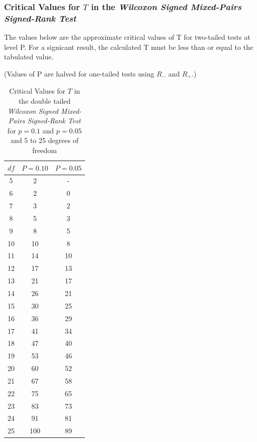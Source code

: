 \subsubsection{Critical Values for $T$ in the \emph{Wilcoxon Signed Mixed-Pairs Signed-Rank Test}}


The values below are the approximate critical values of T for two-tailed tests at level P. For a signicant result, the calculated T must be less  than or equal to the tabulated value.

(Values of P are halved for one-tailed tests using $R_-$ and $R_+$.)

\begin{table}[hbt]
  \begin{tabular}{c|cc}
    $df$ &  $P=0.10$ & $P=0.05$ \\
     \hline
    5 & 2 & - \\
    6 & 2 & 0 \\
    7 & 3 & 2 \\
    8 & 5 & 3 \\
    9 & 8 & 5 \\
    10 & 10 & 8 \\
    11 & 14 & 10 \\
    12 & 17 & 13 \\
    13 & 21 & 17 \\
    14 & 26 & 21 \\
    15 & 30 & 25 \\
    16 & 36 & 29 \\
    17 & 41 & 34 \\
    18 & 47 & 40 \\
    19 & 53 & 46 \\
    20 & 60 & 52 \\
    21 & 67 & 58 \\
    22 & 75 & 65 \\
    23 & 83 & 73 \\
    24 & 91 & 81 \\
    25 & 100 & 89
  \end{tabular}
  \caption{Critical Values for $T$ in the double tailed \emph{Wilcoxon Signed Mixed-Pairs Signed-Rank Test} \\ for $p = 0.1$ and $p=0.05$ and 5 to 25 degrees of freedom}
\end{table}
